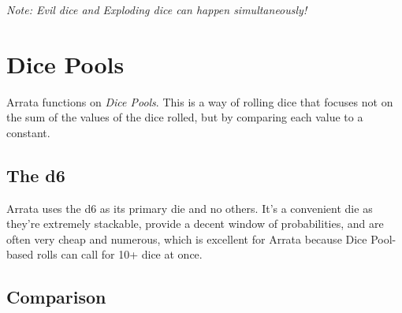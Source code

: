 \documentclass[../main.tex]{subfiles}
\begin{document}
    {\em Note: Evil dice and Exploding dice can happen simultaneously!}

    \section{Dice Pools}

    Arrata functions on {\em Dice Pools}. This is a way of rolling dice that focuses not on the sum of the values of the dice rolled, but by comparing each value to a constant.

    \subsection{The d6}

    Arrata uses the d6 as its primary die and no others. It's a convenient die as they're extremely stackable, provide a decent window of probabilities, and are often very cheap and numerous, which is excellent for Arrata because Dice Pool-based rolls can call for 10+ dice at once.

    \subsection{Comparison}
\end{document}
